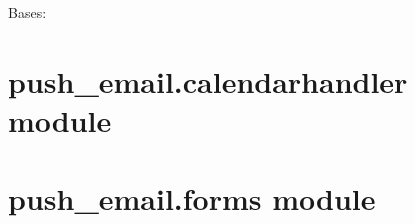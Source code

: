 \documentclass[letterpaper,10pt,english]{sphinxmanual}
\begin{document}
\begin{fulllineitems}
\label{push_email:push_email.apps.PushEmailConfig}
Bases: 

\begin{fulllineitems}
\label{push_email:push_email.apps.PushEmailConfig.name}
\end{fulllineitems}


\end{fulllineitems}



\section{push\_email.calendarhandler module}
\label{push_email:push-email-calendarhandler-module}

\section{push\_email.forms module}
\label{push_email:push-email-forms-module}\label{push_email:module-push_email.forms}
\end{document}
